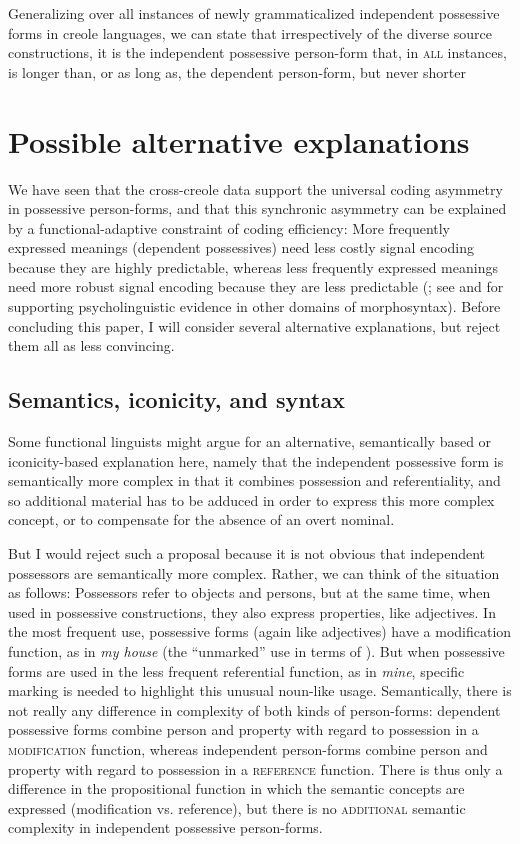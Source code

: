 \documentclass[output=paper]{langsci/langscibook}
\begin{document}
Generalizing over all instances of newly grammaticalized independent possessive forms in creole languages, we can state that irrespectively of the diverse source constructions, it is the independent possessive person-form that, in \textsc{all} instances, is longer than, or as long as, the dependent person-form, but never shorter


\section{Possible alternative explanations}

We have seen that the cross-creole data support the universal coding asymmetry in possessive person-forms, and that this synchronic asymmetry can be explained by a functional-adaptive constraint of coding efficiency: More frequently expressed meanings (dependent possessives) need less costly signal encoding because they are highly predictable, whereas less frequently expressed meanings need more robust signal encoding because they are less predictable (; see \citealt{NorcliffeJaeger2016} and \citealt{JaegerBuz2018} for supporting psycholinguistic evidence in other domains of morphosyntax). Before concluding this paper, I will consider several alternative explanations, but reject them all as less convincing.


\subsection{ Semantics, iconicity, and syntax}

Some functional linguists might argue for an alternative, semantically based or iconicity-based explanation here, namely that the independent possessive form is semantically more complex in that it combines possession and referentiality, and so additional material has to be adduced in order to express this more complex concept, or to compensate for the absence of an overt nominal. 

But I would reject such a proposal because it is not obvious that independent possessors are semantically more complex. Rather, we can think of the situation as follows: Possessors refer to objects and persons, but at the same time, when used in possessive constructions, they also express properties, like adjectives. In the most frequent use, possessive forms (again like adjectives) have a modification function, as in \textit{my house} (the “unmarked” use in terms of \citealt{Croft1991}). But when possessive forms are used in the less frequent referential function, as in \textit{mine}, specific marking is needed to highlight this unusual noun-like usage. Semantically, there is not really any difference in complexity of both kinds of person-forms: dependent possessive forms combine person and property with regard to possession in a \textsc{modification} function, whereas independent person-forms combine person and property with regard to possession in a \textsc{reference} function. There is thus only a difference in the propositional function in which the semantic concepts are expressed (modification vs. reference), but there is no \textsc{additional} semantic complexity in independent possessive person-forms. 
\end{document}
